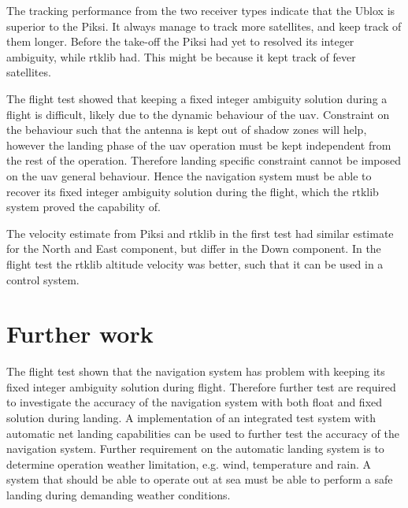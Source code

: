 The tracking performance from the two receiver types indicate that the Ublox is superior to the Piksi. It always manage to track more satellites, and keep track of them longer.
Before the take-off the Piksi had yet to resolved its integer ambiguity, while \gls{rtklib} had. This might be because it kept track of fever satellites.

The flight test showed that keeping a fixed integer ambiguity solution during a flight is difficult, likely due to the dynamic behaviour of the \gls{uav}. Constraint on the behaviour such that the antenna is kept out of shadow zones will help, however the landing phase of the \gls{uav} operation must be kept independent from the rest of the operation. Therefore landing specific constraint cannot be imposed on the \gls{uav} general behaviour. Hence the navigation system must be able to recover its fixed integer ambiguity solution during the flight, which the \gls{rtklib} system proved the capability of.



The velocity estimate from Piksi and \gls{rtklib} in the first test had similar estimate for the North and East component, but differ in the Down component. In the flight test the \gls{rtklib} altitude velocity was better, such that it can be used in a control system.

\section{Further work}
The flight test shown that the navigation system has problem with keeping its fixed integer ambiguity solution during flight.
Therefore further test are required to investigate the accuracy of the navigation system with both float and fixed solution during landing. A implementation of an integrated test system with automatic net landing capabilities can be used to further test the accuracy of the navigation system. Further requirement on the automatic landing system is to determine operation weather limitation, e.g. wind, temperature and rain. A system that should be able to operate out at sea must be able to perform a safe landing during demanding weather conditions.

